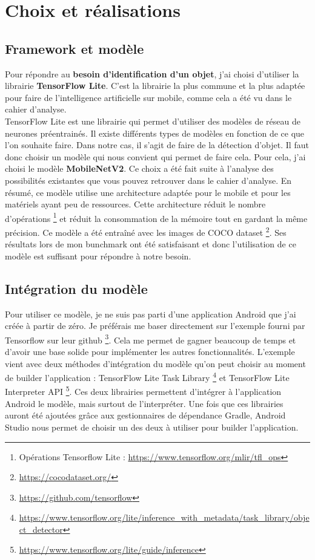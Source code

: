 \documentclass[UTF8]{EPURapport}
\begin{document}
\chapter{Choix et réalisations}

\section{Framework et modèle}

Pour répondre au \textbf{besoin d'identification d'un objet}, j'ai choisi d'utiliser la librairie \textbf{TensorFlow Lite}. C'est la librairie la plus commune et la plus adaptée pour faire de l'intelligence artificielle sur mobile, comme cela a été vu dans le cahier d'analyse.\\

TensorFlow Lite est une librairie qui permet d'utiliser des modèles de réseau de neurones préentrainés. Il existe différents types de modèles en fonction de ce que l'on souhaite faire. Dans notre cas, il s'agit de faire de la détection d'objet. Il faut donc choisir un modèle qui nous convient qui permet de faire cela. Pour cela, j'ai choisi le modèle \textbf{MobileNetV2}. Ce choix a été fait suite à l'analyse des possibilités existantes que vous pouvez retrouver dans le cahier d'analyse. En résumé, ce modèle utilise une architecture adaptée pour le mobile et pour les matériels ayant peu de ressources. Cette architecture réduit le nombre d'opérations \footnote{Opérations Tensorflow Lite : \url{https://www.tensorflow.org/mlir/tfl_ops}} et réduit la consommation de la mémoire tout en gardant la même précision. Ce modèle a été entraîné avec les images de COCO dataset \footnote{\url{https://cocodataset.org/}}. Ses résultats lors de mon bunchmark ont été satisfaisant et donc l'utilisation de ce modèle est suffisant pour répondre à notre besoin.

\section{Intégration du modèle}

Pour utiliser ce modèle, je ne suis pas parti d'une application Android que j'ai créée à partir de zéro. Je préférais me baser directement sur l'exemple fourni par Tensorflow sur leur github \footnote{\url{https://github.com/tensorflow}}. Cela me permet de gagner beaucoup de temps et d'avoir une base solide pour implémenter les autres fonctionnalités. L'exemple vient avec deux méthodes d'intégration du modèle qu'on peut choisir au moment de builder l'application : TensorFlow Lite Task Library \footnote{\url{https://www.tensorflow.org/lite/inference_with_metadata/task_library/object_detector}} et TensorFlow Lite Interpreter API \footnote{\url{https://www.tensorflow.org/lite/guide/inference}}. Ces deux librairies permettent d'intégrer à l'application Android le modèle, mais surtout de l'interpréter. Une fois que ces librairies auront été ajoutées grâce aux gestionnaires de dépendance Gradle, Android Studio nous permet de choisir un des deux à utiliser pour builder l'application.\\
\end{document}
